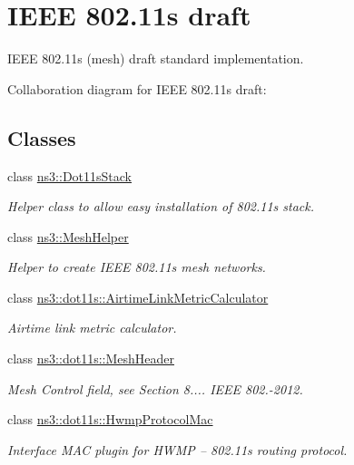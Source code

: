 \hypertarget{group__dot11s}{}\section{I\+E\+EE 802.11s draft}
\label{group__dot11s}


I\+E\+EE 802.\+11s (mesh) draft standard implementation.  


Collaboration diagram for I\+E\+EE 802.11s draft\+:
\subsection*{Classes}
\begin{DoxyCompactItemize}
\item 
class \hyperlink{classns3_1_1Dot11sStack}{ns3\+::\+Dot11s\+Stack}
\begin{DoxyCompactList}\small\item\em Helper class to allow easy installation of 802.\+11s stack. \end{DoxyCompactList}\item 
class \hyperlink{classns3_1_1MeshHelper}{ns3\+::\+Mesh\+Helper}
\begin{DoxyCompactList}\small\item\em Helper to create I\+E\+EE 802.\+11s mesh networks. \end{DoxyCompactList}\item 
class \hyperlink{classns3_1_1dot11s_1_1AirtimeLinkMetricCalculator}{ns3\+::dot11s\+::\+Airtime\+Link\+Metric\+Calculator}
\begin{DoxyCompactList}\small\item\em Airtime link metric calculator. \end{DoxyCompactList}\item 
class \hyperlink{classns3_1_1dot11s_1_1MeshHeader}{ns3\+::dot11s\+::\+Mesh\+Header}
\begin{DoxyCompactList}\small\item\em Mesh Control field, see Section 8.... I\+E\+EE 802.-\/2012. \end{DoxyCompactList}\item 
class \hyperlink{classns3_1_1dot11s_1_1HwmpProtocolMac}{ns3\+::dot11s\+::\+Hwmp\+Protocol\+Mac}
\begin{DoxyCompactList}\small\item\em Interface M\+AC plugin for H\+W\+MP -- 802.\+11s routing protocol. \end{DoxyCompactList}\item 

\end{DoxyCompactItemize}
